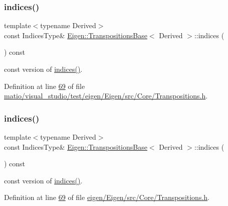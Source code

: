 \subsubsection{\texorpdfstring{indices()}{indices()}\hspace{0.1cm}{\footnotesize\ttfamily [1/4]}}
{\footnotesize\ttfamily template$<$typename Derived$>$ \\
const Indices\+Type\& \hyperlink{class_eigen_1_1_transpositions_base}{Eigen\+::\+Transpositions\+Base}$<$ Derived $>$\+::indices (\begin{DoxyParamCaption}{ }\end{DoxyParamCaption}) const\hspace{0.3cm}{\ttfamily [inline]}}

const version of \hyperlink{class_eigen_1_1_transpositions_base_a20eda0545eb00e887959f38b3a428a96}{indices()}. 

Definition at line \hyperlink{matio_2visual__studio_2test_2eigen_2_eigen_2src_2_core_2_transpositions_8h_source_l00069}{69} of file \hyperlink{matio_2visual__studio_2test_2eigen_2_eigen_2src_2_core_2_transpositions_8h_source}{matio/visual\+\_\+studio/test/eigen/\+Eigen/src/\+Core/\+Transpositions.\+h}.

\mbox{\label{class_eigen_1_1_transpositions_base_a90acc796341b4627882705d1099e593d}} 
\subsubsection{\texorpdfstring{indices()}{indices()}\hspace{0.1cm}{\footnotesize\ttfamily [2/4]}}
{\footnotesize\ttfamily template$<$typename Derived$>$ \\
const Indices\+Type\& \hyperlink{class_eigen_1_1_transpositions_base}{Eigen\+::\+Transpositions\+Base}$<$ Derived $>$\+::indices (\begin{DoxyParamCaption}{ }\end{DoxyParamCaption}) const\hspace{0.3cm}{\ttfamily [inline]}}

const version of \hyperlink{class_eigen_1_1_transpositions_base_a20eda0545eb00e887959f38b3a428a96}{indices()}. 

Definition at line \hyperlink{eigen_2_eigen_2src_2_core_2_transpositions_8h_source_l00069}{69} of file \hyperlink{eigen_2_eigen_2src_2_core_2_transpositions_8h_source}{eigen/\+Eigen/src/\+Core/\+Transpositions.\+h}.

